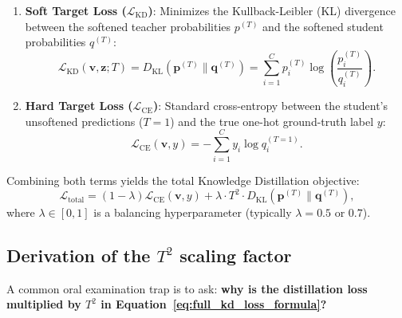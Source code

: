 \begin{enumerate}[leftmargin=*]
  \item \textbf{Soft Target Loss ($\mathcal{L}_{\text{KD}}$)}: Minimizes the Kullback-Leibler (KL) divergence between the softened teacher probabilities $p^{(T)}$ and the softened student probabilities $q^{(T)}$:
    \begin{equation}
    \mathcal{L}_{\text{KD}}(\mathbf{v}, \mathbf{z}; T) = D_{\text{KL}}\left( \mathbf{p}^{(T)} \parallel \mathbf{q}^{(T)} \right) = \sum_{i=1}^C p_i^{(T)} \log\left( \frac{p_i^{(T)}}{q_i^{(T)}} \right).
    \label{eq:kd_kl_divergence}
    \end{equation}
  \item \textbf{Hard Target Loss ($\mathcal{L}_{\text{CE}}$)}: Standard cross-entropy between the student's unsoftened predictions ($T = 1$) and the true one-hot ground-truth label $y$:
    \begin{equation}
    \mathcal{L}_{\text{CE}}(\mathbf{v}, y) = -\sum_{i=1}^C y_i \log q_i^{(T=1)}.
    \end{equation}
\end{enumerate}

Combining both terms yields the total Knowledge Distillation objective:
\begin{equation}
\mathcal{L}_{\text{total}} = (1 - \lambda) \mathcal{L}_{\text{CE}}(\mathbf{v}, y) + \lambda \cdot T^2 \cdot D_{\text{KL}}\left( \mathbf{p}^{(T)} \parallel \mathbf{q}^{(T)} \right),
\label{eq:full_kd_loss_formula}
\end{equation}
where $\lambda \in [0, 1]$ is a balancing hyperparameter (typically $\lambda = 0.5$ or $0.7$).

\subsection{Derivation of the $T^2$ scaling factor}
\label{sec:t_squared_scaling_derivation}

A common oral examination trap is to ask: \textbf{why is the distillation loss multiplied by $T^2$ in Equation~\eqref{eq:full_kd_loss_formula}?}

